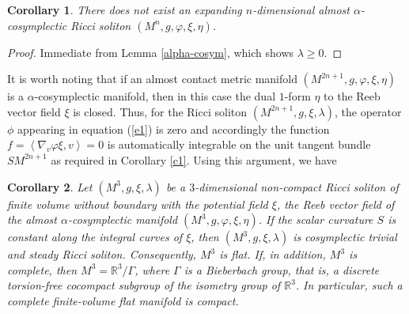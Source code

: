 \documentclass[a4paper, twoside, 10pt]{article}
\numberwithin{equation}{section}
\newtheorem{corollary}{Corollary}[section]
\theoremstyle{definition}
\begin{document}
\begin{corollary}\label{c:noexpanding}
There does not exist an expanding $n$-dimensional
almost $\alpha$-cosymplectic Ricci soliton 
$(M^n, g, \varphi, \xi, \eta)$.
\end{corollary}
\begin{proof}
Immediate from Lemma \ref{alpha-cosym}, which shows $\lambda\geq0$.
\end{proof}

It is worth noting that if an almost contact metric manifold $\left(
M^{2n+1},g, \varphi ,\xi ,\eta \right) $ is a $\alpha $-cosymplectic
manifold, then in this case the dual $1$-form $\eta $ to the Reeb vector
field $\xi $ is closed. Thus, for the Ricci soliton $\left( M^{2n+1},g,\xi
,\lambda \right) $, the operator $\phi $ appearing in equation (\ref{e1}) is zero
and accordingly the function $f=\left\langle \nabla _{v}\varphi \xi
,v\right\rangle =0$ is automatically integrable on the unit tangent bundle $%
SM^{2n+1}$ as required in Corollary \ref{c1}. Using this argument, we have



\begin{corollary}\label{c2}
Let $\left( M^3,g,\xi, \lambda \right)$ be a $3$-dimensional
non-compact Ricci soliton of finite volume without boundary with the potential 
field $\xi$, the Reeb vector field of the almost 
$\alpha$-cosymplectic manifold
 $\left( M^{3},g, \varphi ,\xi ,\eta \right) $. If the scalar curvature $S$ 
is constant along the integral curves of $\xi$, then $\left(M^{3},g,\xi,\lambda \right)$ is cosymplectic trivial and steady Ricci soliton. Consequently, $M^3$ is flat. If, in addition, $M^3$ is complete, then
$M^3=\mathbb{R}^3/\Gamma$, where $\Gamma$ is a Bieberbach group, that
is, a discrete torsion-free cocompact subgroup of the isometry group of
$\mathbb{R}^3$. In particular, such a complete finite-volume flat
manifold is compact.
\end{corollary}
\end{document}
